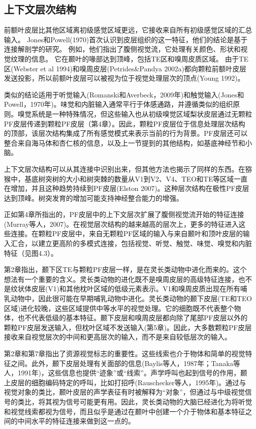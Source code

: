 \subsection{上下文层次结构}
\par
前额叶皮层比其他区域离初级感觉区域更远，它接收来自所有初级感觉区域的汇总输入。
Jones和Powell(1970)首次认识到皮层组织的这一特征，他们的结论是基于连接解剖学的研究。
例如，他们指出了腹侧视觉流，它处理有关颜色、形状和视觉纹理的信息。
它在颞叶的喙部达到顶峰，包括TE区和嗅周皮质区域。
由于TE区(Webster et al 1994)和嗅周皮层(Petrides\&Pandya 2002a)都向颗粒前额叶皮层发送投影，所以前额叶皮层可以被视为位于视觉处理层次的顶点(Young 1992)。
\par
类似的结论适用于听觉输入(Romanski和Averbeck，2009年)和触觉输入(Jones和Powell，1970年)。味觉和内脏输入通常平行于体感通路，并遵循类似的组织原则。嗅觉系统是一种特殊情况，但这些输入也从初级嗅觉区域梨状皮层通过无颗粒PF皮层传递到颗粒PF皮层（第4章）。因此，颗粒PF皮层位于信息处理层次结构的顶部，该层次结构集成了所有感觉模式来表示当前的行为背景。PF皮层还可以整合来自海马体和杏仁核的信息，以及上一节提到的其他结构，如基底神经节和小脑。
\par
上下文层次结构可以从其连接中识别出来，但其他方法也揭示了同样的东西。在猕猴中，基底树突树的大小和树突棘的数量从V1到V2、V4、TEO和TE等区域一直在增加，并且这种趋势持续到PF皮层(Elston 2007)。这种层次结构在极性PF皮层达到顶峰。树突发育的增加可能支持神经整合能力的增强。
\par
正如第4章所指出的，PF皮层中的上下文层次扩展了腹侧视觉流开始的特征连接(Murray等人，2007)。在视觉层次结构的越来越高的层次上，更多的特征进入这些连接。在颗粒PF皮层中，来自无颗粒PF区域的输入与来自颞叶和顶叶皮层的输入汇合，以建立更高阶的多模式连接，包括视觉、听觉、触觉、味觉、嗅觉和内脏特征（见图4.3）。
\par
第2章指出，颞下区TE与颗粒PF皮层一样，是在灵长类动物中进化而来的。这个想法有一个重要的含义。灵长类动物的进化既不是嗅周皮层的高级特征连接，也不是纹状体皮层(V1)和其他枕叶区域的低级元素表示。V1和嗅周皮质出现在所有哺乳动物中，因此很可能在早期哺乳动物中进化。灵长类动物的颞下皮层(TE和TEO区域)进化较晚，这些区域提供中等水平的视觉处理。它的细胞既不代表整个物体，也不代表低级的基本特征。颞下皮层和嗅周皮层都向除了尾部PF皮层以外的颗粒PF皮层发送输入，但枕叶区域不发送输入(第5章)。因此，大多数颗粒PF皮层接收来自视觉层次的中间和更高层次的输入，而不是来自较低层次的输入。
\par
第2章和第7章指出了资源视觉标志的重要性。这些线索也介于物体和简单的视觉特征之间。此外，颞下皮层处理有关面部的信息(Baylis等人，1987年；Tanaka等人，1991年)，这些信息也提供“迹象”或“线索”。声学呼叫也起到信号的作用，颞上皮层的细胞编码特定的呼叫，比如打招呼(Rauschecker等人，1995年)。通过与视觉对象的类比，颞叶皮层的声学表征有时被解释为“对象”，但通过与中级视觉信号的类比，将其视为信号可能更有用。因此，灵长类动物的大脑已经进化为将听觉和视觉线索都视为信号，而且似乎是通过在颞叶中创建一个介于物体和基本特征之间的中间水平的特征连接来做到这一点的。
